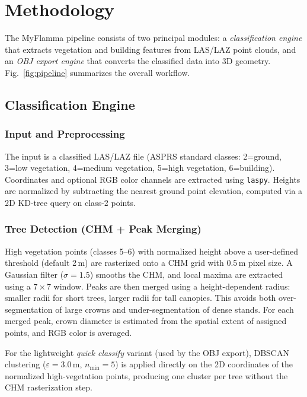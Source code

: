 \section{Methodology}
\label{sec:methodology}

The MyFlamma pipeline consists of two principal modules: a \textit{classification engine} that extracts vegetation and building features from LAS/LAZ point clouds, and an \textit{OBJ export engine} that converts the classified data into 3D geometry. Fig.~\ref{fig:pipeline} summarizes the overall workflow.

\subsection{Classification Engine}

\subsubsection{Input and Preprocessing}
The input is a classified LAS/LAZ file (ASPRS standard classes: 2=ground, 3=low vegetation, 4=medium vegetation, 5=high vegetation, 6=building). Coordinates and optional RGB color channels are extracted using \texttt{laspy}. Heights are normalized by subtracting the nearest ground point elevation, computed via a 2D KD-tree query on class-2 points.

\subsubsection{Tree Detection (CHM + Peak Merging)}
High vegetation points (classes 5--6) with normalized height above a user-defined threshold (default 2\,m) are rasterized onto a CHM grid with 0.5\,m pixel size. A Gaussian filter ($\sigma=1.5$) smooths the CHM, and local maxima are extracted using a $7\times7$ window. Peaks are then merged using a height-dependent radius: smaller radii for short trees, larger radii for tall canopies. This avoids both over-segmentation of large crowns and under-segmentation of dense stands. For each merged peak, crown diameter is estimated from the spatial extent of assigned points, and RGB color is averaged.

For the lightweight \textit{quick classify} variant (used by the OBJ export), DBSCAN clustering ($\varepsilon=3.0$\,m, $n_{\min}=5$) is applied directly on the 2D coordinates of the normalized high-vegetation points, producing one cluster per tree without the CHM rasterization step.

